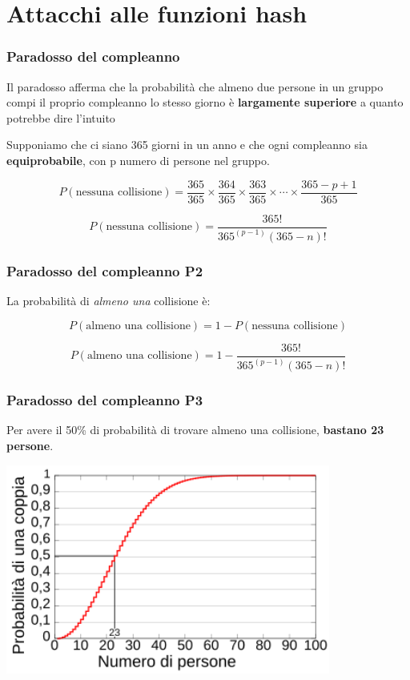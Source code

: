 \section{Attacchi alle funzioni hash}

\begin{frame}
	\frametitle{Paradosso del compleanno}

	Il paradosso afferma che la probabilità che almeno due persone in un gruppo compi il proprio compleanno lo stesso giorno è \textbf{largamente superiore} a quanto potrebbe dire l'intuito

	Supponiamo che ci siano 365 giorni in un anno e che ogni compleanno sia \textbf{equiprobabile}, con p numero di persone nel gruppo.

	\[
		P(\text{nessuna collisione}) = \frac{365}{365} \times \frac{364}{365} \times \frac{363}{365} \times \cdots \times \frac{365 - p + 1}{365}
	\]

	\[
		P(\text{nessuna collisione}) = \frac{365!}{365^(p-1) (365 - n)!}
	\]

\end{frame}

\begin{frame}
	\frametitle{Paradosso del compleanno P2}

	La probabilità di \textit{almeno una} collisione è:

	\[
		P(\text{almeno una collisione}) = 1 - P(\text{nessuna collisione})
	\]

	\[
		P(\text{almeno una collisione}) = 1 - \frac{365!}{365^(p-1) (365 - n)!}
	\]

\end{frame}


\begin{frame}
	\frametitle{Paradosso del compleanno P3}

	Per avere il 50\% di probabilità di trovare almeno una collisione, \textbf{bastano 23 persone}.

	\begin{center}
		\includegraphics[width=0.8\textwidth]{img/2-img/Birthday_Paradox_IT.png}
	\end{center}

\end{frame}

